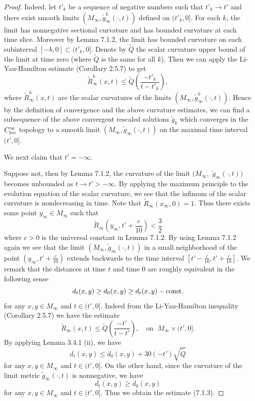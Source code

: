 \begin{proof}
Indeed, let $t'_k$ be a sequence of negative numbers such that
$t'_k\rightarrow t'$ and there exist smooth limits
$(M_{\infty},\tilde{g}_{\infty}^{k}(\cdot,t))$ defined on
$(t'_k,0]$. For each $k$, the limit has nonnegative sectional
curvature and has bounded curvature at each time slice. Moreover
by Lemma 7.1.2, the limit has bounded curvature on each
subinterval $[-b,0]\subset(t'_k,0]$. Denote by $\tilde{Q}$ the
scalar curvature upper bound of the limit at time zero (where
$\tilde{Q}$ is the same for all $k$). Then we can apply the
Li-Yau-Hamilton estimate (Corollary 2.5.7) to get
$$
\tilde{R}_{\infty}^{k}(x,t)\leq\tilde{Q} \left(\frac{-t'_k}{t-t'_k}\right),
$$
where $\tilde{R}_{\infty}^{k}(x,t)$ are the scalar curvatures of
the limits $(M_{\infty},\tilde{g}_{\infty}^{k}(\cdot,t))$.  Hence
by the definition of convergence and the above curvature
estimates, we can find a subsequence of the above convergent
rescaled solutions $\tilde{g}_k$ which converges in the
$C^{\infty}_{\rm loc}$ topology to a smooth limit
$(M_{\infty},\tilde{g}_{\infty}(\cdot,t))$ on the maximal time
interval $(t',0]$.

We next claim that $t'=-\infty$.

Suppose not, then by Lemma 7.1.2, the curvature of the limit
$(M_{\infty},$ $\tilde{g}_{\infty}(\cdot,t))$ becomes unbounded as
$t\rightarrow t'>-\infty$. By applying the maximum principle to
the evolution equation of the scalar curvature, we see that the
infimum of the scalar curvature is nondecreasing in time. Note
that $\tilde{R}_{\infty}(x_{\infty},0) =1$. Thus there exists some
point $y_{\infty}\in M_{\infty}$ such that
$$
\tilde{R}_{\infty}\left(y_{\infty},t'+\frac{c}{10}\right)<\frac{3}{2}
$$
where $c>0$ is the universal constant in Lemma 7.1.2. By using
Lemma 7.1.2 again we see that the limit
$(M_{\infty},\tilde{g}_{\infty}(\cdot,t))$ in a small neighborhood
of the point $(y_{\infty},t'+\frac{c}{10})$ extends backwards to
the time interval $[t'-\frac{c}{10},t'+\frac{c}{10}]$. We remark
that the distances at time $t$ and time $0$ are roughly equivalent
in the following sense \begin{equation}
d_t(x,y) \geq d_0(x,y) \geq d_t(x,y)-{\rm const.}  %
\end{equation} for any $x,y \in M_{\infty}$ and $t \in (t',0]$. Indeed from
the Li-Yau-Hamilton inequality (Corollary 2.5.7) we have the
estimate
$$
\tilde{R}_\infty(x,t) \le \tilde{Q}\left(\frac{-t'}{t-t'}\right),\quad
\mbox{on }\; M_\infty\times(t',0].
$$
By applying Lemma 3.4.1 (ii), we have
$$
d_t(x,y)\le d_0(x,y)+30(-t')\sqrt{\tilde{Q}}
$$
for any $x,y\in M_\infty$ and $t\in(t',0]$. On the other hand,
since the curvature of the limit metric
$\tilde{g}_\infty(\cdot,t)$ is nonnegative, we have
$$
d_t(x,y)\ge d_0(x,y)
$$
for any $x,y\in M_\infty$ and $t\in(t',0]$. Thus we obtain the
estimate (7.1.3).


\end{proof}

